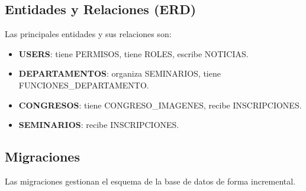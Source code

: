 \documentclass{article}
\begin{document}
\subsection{Entidades y Relaciones (ERD)}

Las principales entidades y sus relaciones son:
\begin{itemize}
    \item \textbf{USERS}: tiene PERMISOS, tiene ROLES, escribe NOTICIAS.
    \item \textbf{DEPARTAMENTOS}: organiza SEMINARIOS, tiene FUNCIONES\_DEPARTAMENTO.
    \item \textbf{CONGRESOS}: tiene CONGRESO\_IMAGENES, recibe INSCRIPCIONES.
    \item \textbf{SEMINARIOS}: recibe INSCRIPCIONES.
\end{itemize}

\subsection{Migraciones}

Las migraciones gestionan el esquema de la base de datos de forma incremental.
\end{document}
